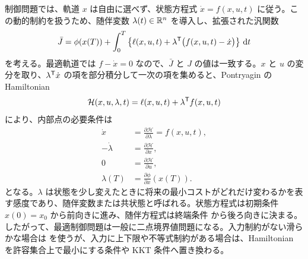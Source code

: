 制御問題では、軌道 $x$ は自由に選べず、状態方程式 $\dot{x}=f(x,u,t)$ に従う。この動的制約を扱うため、随伴変数 $\lambda(t)\in\mathbb{R}^n$ を導入し、拡張された汎関数
\begin{equation}
  \bar{J}
  =
  \phi(x(T))
  +\int_0^T
  \left\{
    \ell(x,u,t)
    +\lambda^{\mathsf{T}}\bigl(f(x,u,t)-\dot{x}\bigr)
  \right\}\,\mathrm{d} t
\end{equation}
を考える。最適軌道では $f-\dot{x}=0$ なので、$\bar{J}$ と $J$ の値は一致する。$x$ と $u$ の変分を取り、$\lambda^{\mathsf{T}}\dot{x}$ の項を部分積分して一次の項を集めると、Pontryagin の Hamiltonian
\begin{equation}
  \mathcal{H}(x,u,\lambda,t)
  =
  \ell(x,u,t)+\lambda^{\mathsf{T}} f(x,u,t)
  \label{eq:pontryagin-hamiltonian}
\end{equation}
により、内部点の必要条件は
\begin{align}
  \dot{x}&=\frac{\partial \mathcal{H}}{\partial \lambda}
  =f(x,u,t),
  \label{eq:pmp-state}\\
  -\dot{\lambda}&=\frac{\partial \mathcal{H}}{\partial x},
  \label{eq:pmp-costate}\\
  0&=\frac{\partial \mathcal{H}}{\partial u},
  \label{eq:pmp-stationarity}\\
  \lambda(T)&=\frac{\partial \phi}{\partial x}(x(T)).
  \label{eq:pmp-terminal}
\end{align}
となる。$\lambda$ は状態を少し変えたときに将来の最小コストがどれだけ変わるかを表す感度であり、随伴変数または共状態と呼ばれる。状態方程式は初期条件 $x(0)=x_0$ から前向きに進み、随伴方程式は終端条件  から後ろ向きに決まる。したがって、最適制御問題は一般に二点境界値問題になる。入力制約がない滑らかな場合は  を使うが、入力に上下限や不等式制約がある場合は、Hamiltonian を許容集合上で最小にする条件や KKT 条件へ置き換わる。

